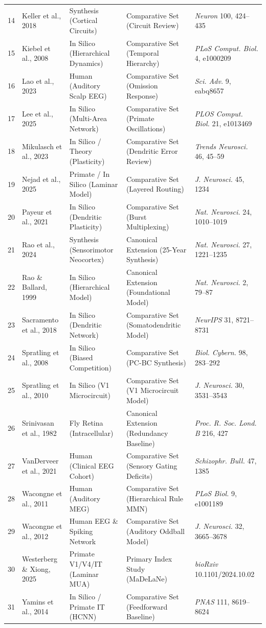 \documentclass[12pt]{article}
\begin{document}
\begin{tabularx}{\textwidth}{@{}r l p{1.6in} p{1.6in} >{\raggedright\arraybackslash}X@{}}
14 & Keller et al., 2018 & Synthesis (Cortical Circuits) & Comparative Set (Circuit Review) & \emph{Neuron} 100, 424--435 \\
15 & Kiebel et al., 2008 & In Silico (Hierarchical Dynamics) & Comparative Set (Temporal Hierarchy) & \emph{PLoS Comput. Biol.} 4, e1000209 \\
16 & Lao et al., 2023 & Human (Auditory Scalp EEG) & Comparative Set (Omission Response) & \emph{Sci. Adv.} 9, eabq8657 \\
17 & Lee et al., 2025 & In Silico (Multi-Area Network) & Comparative Set (Primate Oscillations) & \emph{PLOS Comput. Biol.} 21, e1013469 \\
18 & Mikulasch et al., 2023 & In Silico / Theory (Plasticity) & Comparative Set (Dendritic Error Review) & \emph{Trends Neurosci.} 46, 45--59 \\
19 & Nejad et al., 2025 & Primate / In Silico (Laminar Model) & Comparative Set (Layered Routing) & \emph{J. Neurosci.} 45, 1234 \\
20 & Payeur et al., 2021 & In Silico (Dendritic Plasticity) & Comparative Set (Burst Multiplexing) & \emph{Nat. Neurosci.} 24, 1010--1019 \\
21 & Rao et al., 2024 & Synthesis (Sensorimotor Neocortex) & Canonical Extension (25-Year Synthesis) & \emph{Nat. Neurosci.} 27, 1221--1235 \\
22 & Rao \& Ballard, 1999 & In Silico (Hierarchical Model) & Canonical Extension (Foundational Model) & \emph{Nat. Neurosci.} 2, 79--87 \\
23 & Sacramento et al., 2018 & In Silico (Dendritic Network) & Comparative Set (Somatodendritic Model) & \emph{NeurIPS} 31, 8721--8731 \\
24 & Spratling et al., 2008 & In Silico (Biased Competition) & Comparative Set (PC-BC Synthesis) & \emph{Biol. Cybern.} 98, 283--292 \\
25 & Spratling et al., 2010 & In Silico (V1 Microcircuit) & Comparative Set (V1 Microcircuit Model) & \emph{J. Neurosci.} 30, 3531--3543 \\
26 & Srinivasan et al., 1982 & Fly Retina (Intracellular) & Canonical Extension (Redundancy Baseline) & \emph{Proc. R. Soc. Lond. B} 216, 427 \\
27 & VanDerveer et al., 2021 & Human (Clinical EEG Cohort) & Comparative Set (Sensory Gating Deficits) & \emph{Schizophr. Bull.} 47, 1385 \\
28 & Wacongne et al., 2011 & Human (Auditory MEG) & Comparative Set (Hierarchical Rule MMN) & \emph{PLoS Biol.} 9, e1001189 \\
29 & Wacongne et al., 2012 & Human EEG \& Spiking Network & Comparative Set (Auditory Oddball Model) & \emph{J. Neurosci.} 32, 3665--3678 \\
30 & Westerberg \& Xiong, 2025 & Primate V1/V4/IT (Laminar MUA) & Primary Index Study (MaDeLaNe) & \emph{bioRxiv} 10.1101/2024.10.02 \\
31 & Yamins et al., 2014 & In Silico / Primate IT (HCNN) & Comparative Set (Feedforward Baseline) & \emph{PNAS} 111, 8619--8624 \\
\bottomrule
\end{tabularx}
\end{document}
